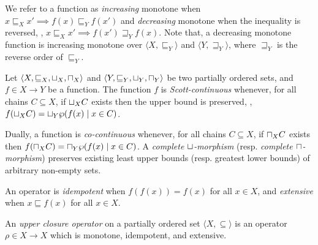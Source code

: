 We refer to a function as \emph{increasing} monotone when $x \sqsubseteq_X x' \implies f(x) \sqsubseteq_Y f(x')$ and \emph{decreasing} monotone when the inequality is reversed, \ie, $x \sqsubseteq_X x' \implies f(x') \sqsupseteq_Y f(x)$. Note that, a decreasing monotone function is increasing monotone over $\langle X, \sqsubseteq_Y \rangle$ and $\langle Y, \sqsupseteq_Y \rangle$, where $\sqsupseteq_Y$ is the reverse order of $\sqsubseteq_Y$.

\begin{definition}
  Let $\langle X, \sqsubseteq_X, \sqcup_X, \sqcap_X \rangle$ and $\langle Y, \sqsubseteq_Y, \sqcup_Y, \sqcap_Y \rangle$ be two partially ordered sets, and $f\in X \to Y$ be a function.
  The function $f$ is \emph{Scott-continuous} whenever, for all chains $C \subseteq X$, if $\sqcup_X C$ exists then the upper bound is preserved, \ie, $f(\sqcup_X C) = \sqcup_Y \wp(f(x) \mid x \in C)$.
\end{definition}

Dually, a function is \emph{co-continuous} whenever, for all chains $C \subseteq X$, if $\sqcap_X C$ exists then $f(\sqcap_X C) = \sqcap_Y \wp(f(x) \mid x \in C)$. A \emph{complete $\sqcup$-morphism} (resp. \emph{complete $\sqcap$-morphism}) preserves existing least upper bounds (resp. greatest lower bounds) of arbitrary non-empty sets.


An operator is \emph{idempotent} when $f(f(x)) = f(x)$ for all $x \in X$, and \emph{extensive} when $x \sqsubseteq f(x)$ for all $x \in X$.

\begin{definition}
  An \emph{upper closure operator} on a partially ordered set $\langle X, \subseteq \rangle$ is an operator $\rho\in X \to X$ which is monotone, idempotent, and extensive.
\end{definition}

